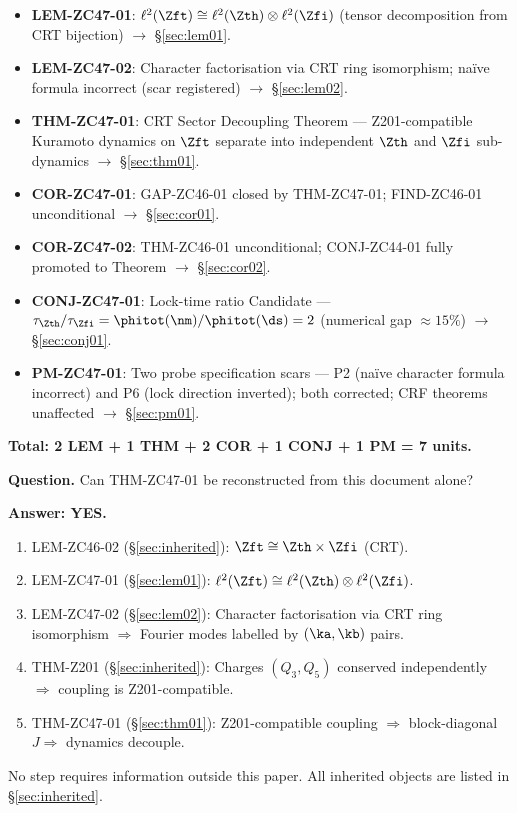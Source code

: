 \documentclass[12pt, a4paper]{article}
\begin{document}
\begin{formalbox}[title={Atomic Units Introduced by ZC47 (7 units)}]
\begin{itemize}[leftmargin=*, noitemsep]
  \item \textbf{LEM-ZC47-01}: $\ell^2(\Zft) \cong \ell^2(\Zth)
    \otimes \ell^2(\Zfi)$ (tensor decomposition from CRT bijection)
    $\to$ \S\ref{sec:lem01}.
  \item \textbf{LEM-ZC47-02}: Character factorisation via CRT ring
    isomorphism; na\"ive formula incorrect (scar registered)
    $\to$ \S\ref{sec:lem02}.
  \item \textbf{THM-ZC47-01}: CRT Sector Decoupling Theorem ---
    Z201-compatible Kuramoto dynamics on $\Zft$ separate into
    independent $\Zth$ and $\Zfi$ sub-dynamics
    $\to$ \S\ref{sec:thm01}.
  \item \textbf{COR-ZC47-01}: GAP-ZC46-01 closed by THM-ZC47-01;
    FIND-ZC46-01 unconditional
    $\to$ \S\ref{sec:cor01}.
  \item \textbf{COR-ZC47-02}: THM-ZC46-01 unconditional;
    CONJ-ZC44-01 fully promoted to Theorem
    $\to$ \S\ref{sec:cor02}.
  \item \textbf{CONJ-ZC47-01}: Lock-time ratio Candidate ---
    $\tau_{\Zth}/\tau_{\Zfi} = \phitot(\nm)/\phitot(\ds)
    = 2$ (numerical gap $\approx 15\%$)
    $\to$ \S\ref{sec:conj01}.
  \item \textbf{PM-ZC47-01}: Two probe specification scars ---
    P2 (na\"ive character formula incorrect) and P6
    (lock direction inverted); both corrected; CRF theorems unaffected
    $\to$ \S\ref{sec:pm01}.
\end{itemize}
\textbf{Total: 2 LEM + 1 THM + 2 COR + 1 CONJ + 1 PM = 7 units.}
\end{formalbox}

\begin{formalbox}[title={Reconstruction Test (CUIP No-Loss)}]
\textbf{Question.}
Can THM-ZC47-01 be reconstructed from this document alone?

\textbf{Answer: YES.}
\begin{enumerate}[leftmargin=*, noitemsep]
  \item LEM-ZC46-02 (\S\ref{sec:inherited}):
    $\Zft \cong \Zth \times \Zfi$ (CRT).
  \item LEM-ZC47-01 (\S\ref{sec:lem01}):
    $\ell^2(\Zft) \cong \ell^2(\Zth) \otimes \ell^2(\Zfi)$.
  \item LEM-ZC47-02 (\S\ref{sec:lem02}):
    Character factorisation via CRT ring isomorphism
    $\Rightarrow$ Fourier modes labelled by $(\ka,\kb)$ pairs.
  \item THM-Z201 (\S\ref{sec:inherited}):
    Charges $(Q_3, Q_5)$ conserved independently
    $\Rightarrow$ coupling is Z201-compatible.
  \item THM-ZC47-01 (\S\ref{sec:thm01}): Z201-compatible coupling
    $\Rightarrow$ block-diagonal $J \Rightarrow$ dynamics decouple.
\end{enumerate}
No step requires information outside this paper.
All inherited objects are listed in \S\ref{sec:inherited}.
\end{formalbox}
\end{document}

